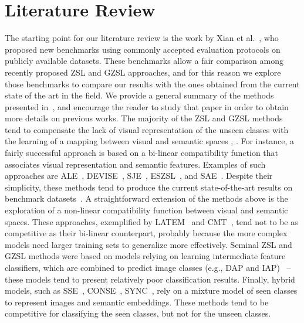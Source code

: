 \documentclass[runningheads]{llncs}
\begin{document}
\section{Literature Review}
\label{sec:lit_review}

The starting point for our literature review is the work by Xian et al.~\cite{XianCVPR2017,XianCVPR2018}, who proposed new benchmarks using commonly accepted evaluation protocols on publicly available datasets.  These benchmarks allow a fair comparison among recently proposed ZSL and GZSL approaches, and for this reason we explore those benchmarks to compare our results with the ones obtained from the current state of the art in the field.  We provide a general summary of the methods presented in~\cite{XianCVPR2017}, and encourage the reader to study that paper in order to obtain more details on previous works.  
The majority of the ZSL and GZSL methods tend to compensate the lack of visual representation of the unseen classes with the learning of a mapping between visual and semantic spaces \cite{chen2018preserving}, \cite{annadani2018relations}.
For instance, a fairly successful approach is based on a bi-linear compatibility function that associates visual representation and semantic features.  Examples of such approaches are ALE~\cite{akata2016label}, DEVISE~\cite{frome2013devise},  SJE~\cite{akata2015evaluation}, ESZSL~\cite{romera2015embarrassingly}, and SAE~\cite{kodirov2017semantic}.  Despite their simplicity, these methods tend to produce the current state-of-the-art results on benchmark datasets~\cite{XianCVPR2017}.  A straightforward extension of the methods above is the exploration of a non-linear compatibility function between visual and semantic spaces.  These approaches, exemplified by LATEM~\cite{xian2016latent} and CMT~\cite{socher2013zero}, tend not to be as competitive as their bi-linear counterpart, probably because the more complex models need larger training sets to generalize more effectively.
Seminal ZSL and GZSL methods were based on models relying on learning intermediate feature classifiers, which are combined to predict image classes (e.g., DAP and IAP)~\cite{lampert2014attribute} -- these models tend to present relatively poor classification results.
Finally, hybrid models, such as SSE~\cite{zhang2015zero}, CONSE~\cite{norouzi2013zero}, SYNC~\cite{changpinyo2016synthesized}, rely on a mixture model of seen classes to represent images and semantic embeddings.  These methods tend to be competitive for classifying the seen classes, but not for the unseen classes.
\end{document}
